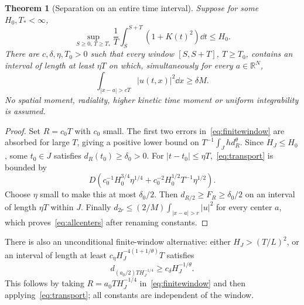 \documentclass[11pt,a4paper]{article}
\newtheorem{theorem}{Theorem}[section]
\theoremstyle{remark}\newtheorem{remark}[theorem]{Remark}
\newcommand{\R}{\mathbb R}\newcommand{\C}{\mathbb C}
\begin{document}
\begin{theorem}[Separation on an entire time interval]\label{thm:average}
Suppose for some $H_0,T_*<\infty$,
\[
 \sup_{S\ge0,\,T\ge T_*}\frac1T\int_S^{S+T}(1+K(t)^2)\dd t\le H_0.
\]
There are $c,\delta,\eta,T_0>0$ such that every window $[S,S+T]$, $T\ge T_0$, contains an interval of length at least $\eta T$ on which, simultaneously for every $a\in\R^N$,
\begin{equation}\label{eq:allcenters}
 \int_{|x-a|>cT}|u(t,x)|^2\dd x\ge\delta M.
\end{equation}
No spatial moment, radiality, higher kinetic time moment or uniform integrability is assumed.
\end{theorem}
\begin{proof}
Set $R=c_0T$ with $c_0$ small. The first two errors in~\eqref{eq:finitewindow} are absorbed for large $T$, giving a positive lower bound on $T^{-1}\int_Jhd_R^\theta$. Since $H_J\le H_0$, some $t_0\in J$ satisfies $d_R(t_0)\ge\delta_0>0$. For $|t-t_0|\le\eta T$,~\eqref{eq:transport} is bounded by
\[
 D(c_0^{-1}H_0^{3/4}\eta^{1/4}
       +c_0^{-2}H_0^{1/2}T^{-1}\eta^{1/2}).
\]
Choose $\eta$ small to make this at most $\delta_0/2$. Then $d_{R/2}\ge F_R\ge\delta_0/2$ on an interval of length $\eta T$ within $J$. Finally
$d_{2r}\le(2/M)\int_{|x-a|>r}|u|^2$ for every center $a$, which proves~\eqref{eq:allcenters} after renaming constants.
\end{proof}

There is also an unconditional finite-window alternative: either $H_J>(T/L)^2$, or an interval of length at least
$c_\eta H_J^{-4(1+1/\theta)}T$ satisfies
\[
 d_{(a_0/2)TH_J^{-1/4}}\ge c_\delta H_J^{-1/\theta}.
\]
This follows by taking $R=a_0TH_J^{-1/4}$ in~\eqref{eq:finitewindow} and then applying~\eqref{eq:transport}; all constants are independent of the window.
\end{document}
